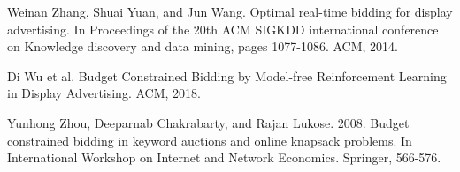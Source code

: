 \documentclass{sig-alternate-05-2015}
\begin{document}
\begin{thebibliography}{9}
Weinan Zhang, Shuai Yuan, and Jun Wang. Optimal real-time bidding for display advertising. 
In Proceedings of the 20th ACM SIGKDD international conference on Knowledge discovery and data mining, pages 1077-1086. ACM, 2014.

Di Wu et al.
Budget Constrained Bidding by Model-free Reinforcement Learning in Display Advertising. ACM, 2018.

Yunhong Zhou, Deeparnab Chakrabarty, and Rajan Lukose. 2008. 
Budget constrained bidding in keyword auctions and online knapsack problems. 
In International Workshop on Internet and Network Economics. Springer, 566-576.

\end{thebibliography}
\end{document}
